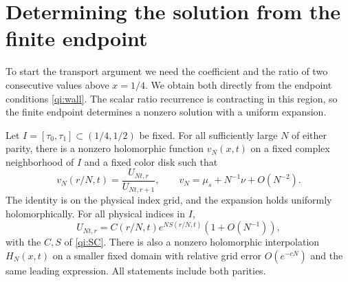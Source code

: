\section{Determining the solution from the finite endpoint}\label{qi:high-index-section}

To start the transport argument we need the coefficient and the ratio
of two consecutive values above $x=1/4$. We obtain both directly
from the endpoint conditions \eqref{qi:wall}. The scalar ratio
recurrence is contracting in this region, so the finite endpoint
determines a nonzero solution with a uniform expansion.

\begin{lemma}\label{qi:high-index}
Let $I=[\tau_0,\tau_1]\subset(1/4,1/2)$ be fixed. For all
sufficiently large $N$ of either parity, there is a nonzero holomorphic
function $v_N(x,t)$ on a fixed complex neighborhood of $I$ and a fixed
color disk such that
\[
 v_N(r/N,t)=\frac{U_{Nt,r}}{U_{Nt,r+1}},\qquad
 v_N=\mu_s+N^{-1}\nu+O(N^{-2}).
\]
The identity is on the physical index grid, and the expansion holds
uniformly holomorphically. For all physical indices in $I$,
\begin{equation}\label{qi:high-index-leading}
 U_{Nt,r}=C(r/N,t)e^{NS(r/N,t)}(1+O(N^{-1})),
\end{equation}
with the $C,S$ of \eqref{qi:SC}. There is also a nonzero
holomorphic interpolation $H_N(x,t)$ on a smaller fixed domain with
relative grid error $O(e^{-cN})$ and the same leading expression.
All statements include both parities.
\end{lemma}

